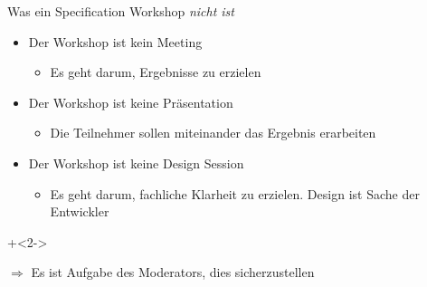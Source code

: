 \begin{frame}{Was ein Specification Workshop \em nicht \em ist}

\begin{itemize}
	\item Der Workshop ist kein Meeting
	\begin{itemize}
		\item Es geht darum, Ergebnisse zu erzielen
	\end{itemize}
	
	\item Der Workshop ist keine Präsentation
	\begin{itemize}
		\item Die Teilnehmer sollen miteinander das Ergebnis erarbeiten
	\end{itemize}
	
	\item Der Workshop ist keine Design Session
	\begin{itemize}
		\item Es geht darum, fachliche Klarheit zu erzielen. Design ist Sache der Entwickler
	\end{itemize}
	
\end{itemize}

\onslide+<2->
	
$\Rightarrow$ Es ist Aufgabe des Moderators, dies sicherzustellen

\end{frame}


